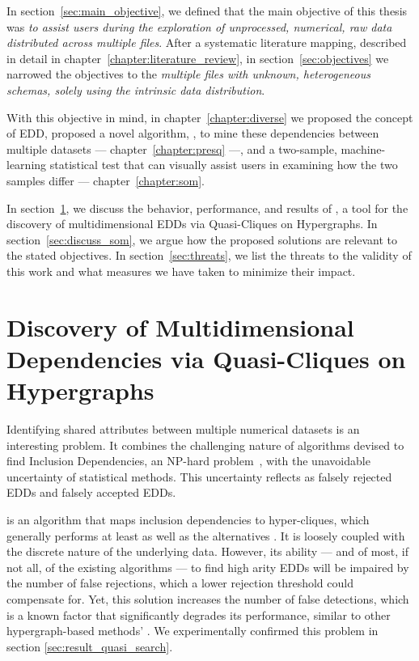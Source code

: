 
In section~\ref{sec:main_objective}, we defined that the main objective of this thesis
was \emph{to assist users during the exploration of unprocessed,
numerical, raw data distributed across multiple files}.
After a systematic literature mapping,
described in detail in chapter~\ref{chapter:literature_review}, in section~\ref{sec:objectives} we
narrowed the objectives to the \emph{multiple files with unknown, heterogeneous schemas, solely using the intrinsic data distribution}.

With this objective in mind, in chapter~\ref{chapter:diverse}
we proposed the concept of \gls{EDD},
proposed a novel algorithm, \PresQ, to mine these dependencies between multiple
datasets --- chapter~\ref{chapter:presq} ---, and a two-sample, machine-learning statistical
test that can visually assist users in examining how the two samples differ --- 
chapter~\ref{chapter:som}.

In section~\ref{sec:discuss_presq}, we discuss the behavior, performance, and results of
\PresQ, a tool for the discovery of multidimensional \glspl{EDD} via Quasi-Cliques
on Hypergraphs. In section~\ref{sec:discuss_som}, we argue how the
proposed solutions are relevant to the stated objectives. In
section~\ref{sec:threats}, we list the threats to the validity of this work and
what measures we have taken to minimize their impact.

\section{Discovery of Multidimensional Dependencies via Quasi-Cliques on Hypergraphs}
\label{sec:discuss_presq}

Identifying shared attributes between multiple numerical datasets is an interesting
problem. It combines the challenging nature of algorithms devised to find Inclusion Dependencies,
an NP-hard problem~\cite{kantola1992}, with the unavoidable uncertainty of statistical
methods.
This uncertainty reflects as falsely rejected \glspl{EDD} and falsely accepted \glspl{EDD}.

\Find is an algorithm that maps inclusion dependencies to hyper-cliques,
which generally performs  at least as well as the alternatives \cite{Dursch2019}.
It is loosely coupled with the discrete nature of the underlying data.
However, its ability --- and of most, if not all, of the existing algorithms --- to find
high arity \glspl{EDD} will be impaired by the number of false rejections,
which a lower rejection threshold could compensate for. Yet, this
solution increases the number of false detections, which is a known factor that 
significantly degrades its performance, similar to other hypergraph-based methods' \cite{koeller2006heuristic}.
We experimentally confirmed this problem in section \ref{sec:result_quasi_search}.


